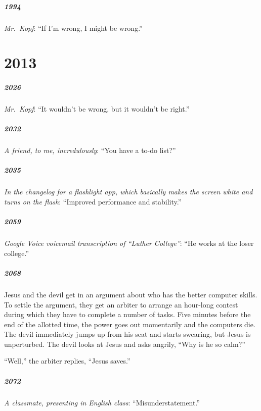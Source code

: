 \documentclass[10pt]{memoir}
\newcommand{\intro}[1]{\emph{#1}}
\begin{document}
\paragraph{1994} \intro{Mr.\ Kopf}: ``If I'm wrong, I might be wrong.''

\chapter{2013}
\paragraph{2026} \intro{Mr.\ Kopf}: ``It wouldn't be wrong, but it wouldn't be right.''

\paragraph{2032} \intro{A friend, to me, incredulously}: ``You have a to-do list?''

\paragraph{2035} \intro{In the changelog for a flashlight app, which basically makes the screen white and turns on the flash}: ``Improved performance and stability.''

\paragraph{2059} \intro{Google Voice voicemail transcription of ``Luther College''}: ``He works at the loser college.''

\paragraph{2068} Jesus and the devil get in an argument about who has the better computer skills. To settle the argument, they get an arbiter to arrange an hour-long contest during which they have to complete a number of tasks. Five minutes before the end of the allotted time, the power goes out momentarily and the computers die. The devil immediately jumps up from his seat and starts swearing, but Jesus is unperturbed. The devil looks at Jesus and asks angrily, ``Why is he so calm?''

``Well,'' the arbiter replies, ``Jesus saves.''

\paragraph{2072} \intro{A classmate, presenting in English class}: ``Misunderstatement.''
\end{document}
